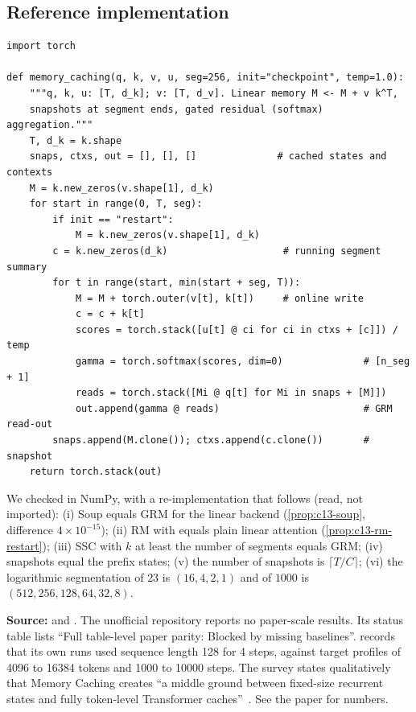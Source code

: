 \subsection{Reference implementation}

\begin{lstlisting}[caption={Reference implementation (ours): segment-snapshot memory caching with gated aggregation (linear backend, GRM)},label={lst:c13-mc-ref}]
import torch

def memory_caching(q, k, v, u, seg=256, init="checkpoint", temp=1.0):
    """q, k, u: [T, d_k]; v: [T, d_v]. Linear memory M <- M + v k^T,
    snapshots at segment ends, gated residual (softmax) aggregation."""
    T, d_k = k.shape
    snaps, ctxs, out = [], [], []              # cached states and contexts
    M = k.new_zeros(v.shape[1], d_k)
    for start in range(0, T, seg):
        if init == "restart":
            M = k.new_zeros(v.shape[1], d_k)
        c = k.new_zeros(d_k)                    # running segment summary
        for t in range(start, min(start + seg, T)):
            M = M + torch.outer(v[t], k[t])     # online write
            c = c + k[t]
            scores = torch.stack([u[t] @ ci for ci in ctxs + [c]]) / temp
            gamma = torch.softmax(scores, dim=0)              # [n_seg + 1]
            reads = torch.stack([Mi @ q[t] for Mi in snaps + [M]])
            out.append(gamma @ reads)                         # GRM read-out
        snaps.append(M.clone()); ctxs.append(c.clone())       # snapshot
    return torch.stack(out)
\end{lstlisting}

We checked in NumPy, with a re-implementation that follows  (read, not imported):
(i) Soup equals GRM for the linear backend (\cref{prop:c13-soup}, difference $4\times10^{-15}$); (ii) RM with
 equals plain linear attention (\cref{prop:c13-rm-restart}); (iii) SSC with $k$ at least the
number of segments equals GRM; (iv)  snapshots equal the prefix states; (v) the number of
snapshots is $\lceil T/C\rceil$; (vi) the logarithmic segmentation of $23$ is $(16,4,2,1)$ and of $1000$ is
$(512,256,128,64,32,8)$.

\begin{results}
\textbf{Source:}  and
. The unofficial repository reports no paper-scale
results. Its status table lists ``Full table-level paper parity: Blocked by missing baselines''.
 records that its own runs used sequence length 128 for 4 steps,
against target profiles of 4096 to 16384 tokens and 1000 to 10000 steps. The survey states qualitatively
that Memory Caching creates ``a middle ground between fixed-size recurrent states and fully token-level
Transformer caches''~\citep{zhoubian2026memory}. See the paper for numbers.
\end{results}

